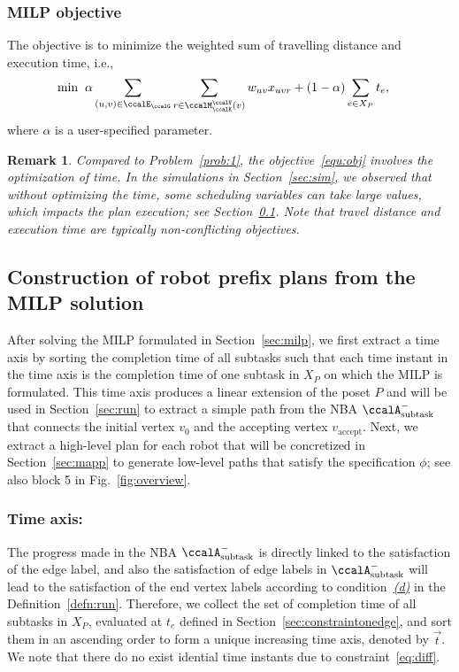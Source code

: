 \documentclass[Afour,sageh,times]{sagej}
\newtheorem{rem}[thm]{Remark}
\newcommand{\auto}[1]{\ccalA_{\textup{#1}}}
\begin{document}
{{{\subsubsection{MILP objective}The objective is to minimize the weighted sum of travelling distance and execution time, i.e.,
\begingroup\makeatletter\def\f@size{10}\check@mathfonts
\def\maketag@@@#1{\hbox{\m@th\normalsize\normalfont#1}}%
\begin{align}\label{equ:obj}
  \min \; \;&  \alpha \sum_{(u,v)\in \ccalE_\ccalG}  \sum_{r \in \ccalM^\ccalV_{\ccalK}(v)} w_{uv} x_{uvr} +  (1 - \alpha) \sum_{e\in X_P} t_e,
\end{align}
 \endgroup
  where $\alpha$ is a user-specified parameter.
  \begin{rem}
   Compared to Problem~\ref{prob:1}, the objective~\eqref{equ:obj} involves the optimization of time. In the simulations in Section~\ref{sec:sim}, we observed that without optimizing the time, some scheduling variables can take large values, which impacts the plan execution; see Section~\ref{sec:path}. Note that travel distance and execution time are typically non-conflicting objectives.

  \end{rem}
\subsection{Construction of robot prefix plans from the MILP solution}\label{sec:path}
After solving the MILP formulated in Section~\ref{sec:milp}, we first extract a time axis by sorting the completion time of all subtasks such that each time instant in the time axis is the completion time of one subtask in $X_P$ on which the MILP is formulated. This time axis produces a linear extension of the poset $P$ and  will be used in Section~\ref{sec:run} to extract a simple path from the NBA $\auto{subtask}^-$ that connects the initial vertex $v_0$ and the accepting vertex $v_\text{accept}$. Next, we extract a high-level plan for each robot  that will be concretized in Section~\ref{sec:mapp} to generate low-level paths that satisfy the specification $\phi$; see also block 5 in Fig.~\ref{fig:overview}.


\subsubsection{Time axis:}\label{sec:timeaxis} The progress made in the NBA $\auto{subtask}^-$ is directly linked to the satisfaction of the edge label, and also the satisfaction of edge labels in $\auto{subtask}^-$ will lead to the satisfaction of the end vertex labels according to condition~\hyperref[cond:d]{\it (d)} in the Definition~\ref{defn:run}. Therefore, we collect the  set of completion time of all subtasks in $X_P$, evaluated at $t_e$ defined in Section~\ref{sec:constraintonedge}, and sort them in an ascending order to form a unique increasing time axis, denoted by $\vec{t}$. We note that there do no exist idential time instants due to constraint~\eqref{eq:diff}.

}}}
\end{document}
